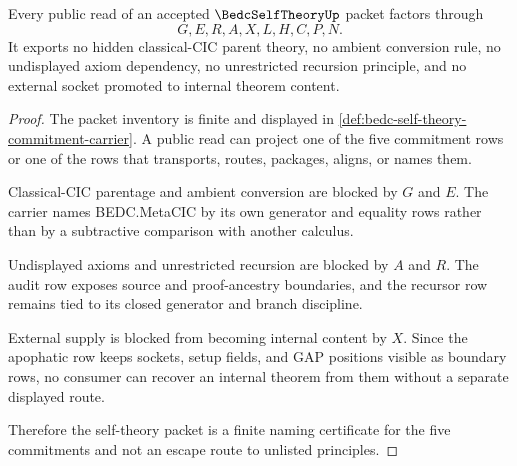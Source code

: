 \begin{theorem}
\label{thm:bedc-self-theory-nonescape}
Every public read of an accepted $\BedcSelfTheoryUp$ packet factors through
$$
G,E,R,A,X,L,H,C,P,N.
$$
It exports no hidden classical-CIC parent theory, no ambient conversion rule, no undisplayed axiom dependency, no unrestricted recursion principle, and no external socket promoted to internal theorem content.
\end{theorem}
\begin{proof}
The packet inventory is finite and displayed in \autoref{def:bedc-self-theory-commitment-carrier}. A public read can project one of the five commitment rows or one of the rows that transports, routes, packages, aligns, or names them.

Classical-CIC parentage and ambient conversion are blocked by $G$ and $E$. The carrier names BEDC.MetaCIC by its own generator and equality rows rather than by a subtractive comparison with another calculus.

Undisplayed axioms and unrestricted recursion are blocked by $A$ and $R$. The audit row exposes source and proof-ancestry boundaries, and the recursor row remains tied to its closed generator and branch discipline.

External supply is blocked from becoming internal content by $X$. Since the apophatic row keeps sockets, setup fields, and GAP positions visible as boundary rows, no consumer can recover an internal theorem from them without a separate displayed route.

Therefore the self-theory packet is a finite naming certificate for the five commitments and not an escape route to unlisted principles.
\end{proof}


\begin{closurestatus}{\BedcSelfTheoryUp}
  \theoryclosure{\seedClosure}
  \formalstatus{\unformalizedV}
\end{closurestatus}
